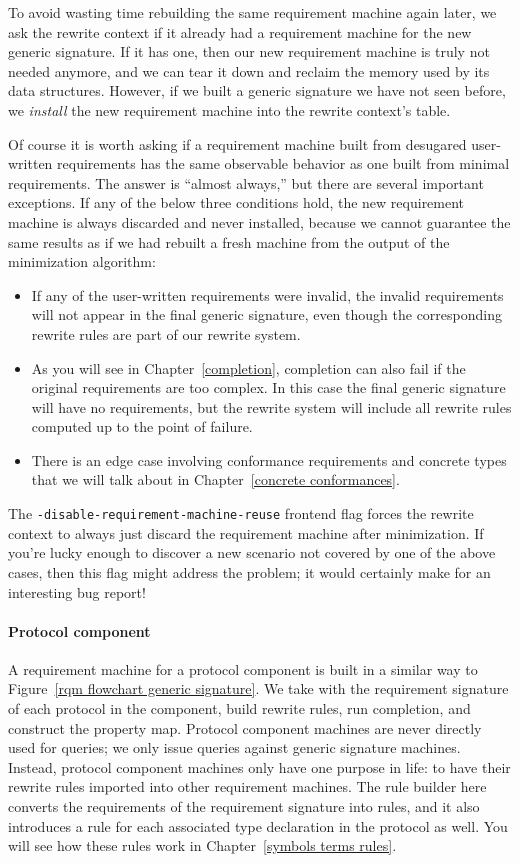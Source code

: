 \documentclass[../generics]{subfiles}
\begin{document}
To avoid wasting time rebuilding the same requirement machine again later, we ask the rewrite context if it already had a requirement machine for the new generic signature. If it has one, then our new requirement machine is truly not needed anymore, and we can tear it down and reclaim the memory used by its data structures. However, if we built a generic signature we have not seen before, we \emph{install} the new requirement machine into the rewrite context's table.

%
Of course it is worth asking if a requirement machine built from desugared user-written requirements has the same observable behavior as one built from minimal requirements. The answer is ``almost always,'' but there are several important exceptions. If any of the below three conditions hold, the new requirement machine is always discarded and never installed, because we cannot guarantee the same results as if we had rebuilt a fresh machine from the output of the minimization algorithm:
\begin{itemize}
\item If any of the user-written requirements were invalid, the invalid requirements will not appear in the final generic signature, even though the corresponding rewrite rules are part of our rewrite system.
\item As you will see in Chapter~\ref{completion}, completion can also fail if the original requirements are too complex. In this case the final generic signature will have no requirements, but the rewrite system will include all rewrite rules computed up to the point of failure.
\item There is an edge case involving conformance requirements and concrete types that we will talk about in Chapter~\ref{concrete conformances}.
\end{itemize}
 The \texttt{-disable-requirement-machine-reuse} frontend flag forces the rewrite context to always just discard the requirement machine after minimization. If you're lucky enough to discover a new scenario not covered by one of the above cases, then this flag might address the problem; it would certainly make for an interesting bug report!

\paragraph{Protocol component}
%
A requirement machine for a protocol component is built in a similar way to Figure~\ref{rqm flowchart generic signature}. We take with the requirement signature of each protocol in the component, build rewrite rules, run completion, and construct the property map. Protocol component machines are never directly used for queries; we only issue queries against generic signature machines. Instead, protocol component machines only have one purpose in life: to have their rewrite rules imported into other requirement machines.
\eject
The rule builder here converts the requirements of the requirement signature into rules, and it also introduces a rule for each associated type declaration in the protocol as well. You will see how these rules work in Chapter~\ref{symbols terms rules}.
\end{document}
